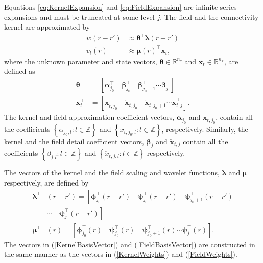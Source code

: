 \documentclass[journal]{IEEEtran}
\begin{document}
Equations \eqref{eq:KernelExpansion} and \eqref{eq:FieldExpansion} are infinite series expansions and must be truncated at some level $j$. The field and the connectivity kernel are approximated by
\begin{align}
	w\left(r-r'\right) &\approx \boldsymbol\theta^\top\boldsymbol\lambda\left(r-r'\right) 
	\label{eq:KernelFiniteExpansion} \\
	v_t\left(r\right) &\approx \boldsymbol\mu\left(r\right)^\top\mathbf{x}_t,
	\label{eq:FieldFiniteExpansion}
\end{align}
where the unknown parameter and state vectors, $\boldsymbol\theta \in \mathbb{R}^{n_{\theta}}$ and $\mathbf{x}_t \in \mathbb{R}^{n_x}$, are defined as 
\begin{align}
\boldsymbol\theta^\top &=\left[ \boldsymbol\alpha_{j_0}^\top \quad \boldsymbol\beta_{j_0}^\top \quad \boldsymbol\beta_{j_0+1}^\top \cdots \boldsymbol\beta_{j}^\top\right] 
\label{KernelWeights} \\
\mathbf{x}_{t}^\top &=\left[\mathbf{x}_{t,j_{0}}^\top \quad  \check{\mathbf{x}}_{t,j_{0}}^\top \quad  \check{\mathbf{x}}_{t,j_{0}+1}^\top \cdots \check{\mathbf{x}}_{t,j}^\top\right].
\label{FieldWeights}
\end{align}
The kernel and field approximation coefficient vectors, $\boldsymbol \alpha_{j_0}$ and $\mathbf{x}_{t,j_{0}}$, contain all the coefficients $\left\lbrace\alpha_{j_0, l}:l \in \mathbb{Z} \right\rbrace $ and $\left\lbrace x_{t,j_0, l}: l \in \mathbb{Z}\right\rbrace$, respectively. Similarly, the kernel and the field detail coefficient vectors, $\boldsymbol\beta_{j}$ and $\check{\mathbf{x}}_{t,j}$ contain all the coefficients $\left\lbrace \beta_{j,l} :l \in \mathbb{Z}\right\rbrace$ and $\left\lbrace  \check x_{t,j, l}:l \in \mathbb{Z}\right\rbrace$ respectively.

The vectors of the kernel and the field scaling and wavelet functions, $\boldsymbol\lambda$ and $\boldsymbol\mu$ respectively, are defined by
\begin{align}
 \boldsymbol\lambda^\top & (r-r')=\left[ \boldsymbol\phi_{j_0}^\top(r-r') \quad \boldsymbol\psi_{j_0}^\top(r-r') \quad \boldsymbol\psi_{j_0+1}^\top(r-r') \right. \nonumber \\
&\left. \cdots \quad \boldsymbol\psi_{j}^\top(r-r')\right] \label{KernelBasisVector} \\
 \boldsymbol\mu^\top & (r)=\left[ \boldsymbol\phi_{j_0}^\top(r) \quad \boldsymbol\psi_{j_0}^\top(r) \quad \boldsymbol\psi_{j_0+1}^\top(r) \cdots \boldsymbol\psi_{j}^\top(r) \right]. 
\label{FieldBasisVector}
\end{align}
The vectors in  (\ref{KernelBasisVector}) and (\ref{FieldBasisVector}) are constructed in the same manner as the vectors in  (\ref{KernelWeights}) and (\ref{FieldWeights}). 
 
\end{document}

